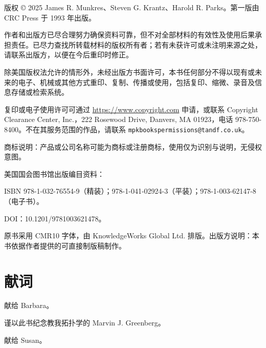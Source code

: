 版权 © 2025 James R. Munkres、Steven G. Krantz、Harold R. Parks。第一版由 CRC Press 于 1993 年出版。

作者和出版方已尽合理努力确保资料可靠，但不对全部材料的有效性及使用后果承担责任。已尽力查找所转载材料的版权所有者；若有未获许可或未注明来源之处，请联系出版方，以便在今后重印时修正。

除美国版权法允许的情形外，未经出版方书面许可，本书任何部分不得以现有或未来的电子、机械或其他方式重印、复制、传播或使用，包括复印、缩微、录音及信息存储或检索系统。

复印或电子使用许可可通过 \url{https://www.copyright.com} 申请，或联系 Copyright Clearance Center, Inc.，222 Rosewood Drive, Danvers, MA 01923，电话 978-750-8400。不在其服务范围的作品，请联系 \nolinkurl{mpkbookspermissions@tandf.co.uk}。

商标说明：产品或公司名称可能为商标或注册商标，使用仅为识别与说明，无侵权意图。

美国国会图书馆出版编目资料：\par
ISBN 978-1-032-76554-9（精装）；978-1-041-02924-3（平装）；978-1-003-62147-8（电子书）。\par
DOI：10.1201/9781003621478。

原书采用 CMR10 字体，由 KnowledgeWorks Global Ltd. 排版。出版方说明：本书依据作者提供的可直接制版稿制作。

\chapter*{献词}
献给 Barbara。

谨以此书纪念教我拓扑学的 Marvin J. Greenberg。

献给 Susan。
